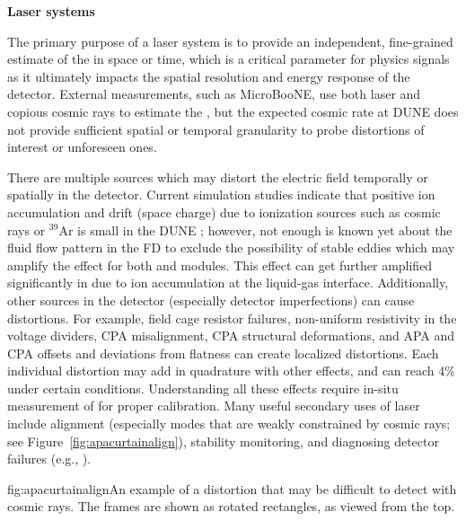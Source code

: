 \textbf{Laser systems} 

The primary purpose of a laser system is to provide an independent, fine-grained estimate of the \efield in space or time, which is a critical parameter for physics signals as it ultimately impacts the spatial resolution and energy response of the detector. External measurements, such as MicroBooNE, use both laser and copious cosmic rays to estimate the \efield, but the expected cosmic rate at DUNE does not provide sufficient spatial or temporal granularity to probe distortions of interest or unforeseen ones. 

There are multiple sources which may distort the electric field temporally or spatially in the detector. Current simulation studies indicate that positive ion accumulation and drift (space charge) due to ionization sources such as cosmic rays or ${}^{39}$Ar is small in the DUNE ; however, not enough is known yet about the fluid flow pattern in the FD to exclude the possibility of stable eddies which may amplify the effect for both \single and \dual modules. This effect can get further amplified significantly in  due to ion accumulation at the liquid-gas interface. 
Additionally, other sources in the detector (especially detector imperfections) can cause \efield distortions. For example, field cage resistor failures, non-uniform resistivity in the voltage dividers, CPA misalignment, CPA structural deformations, and APA and CPA offsets and  deviations from flatness can create localized \efield distortions. Each individual \efield distortion may add in quadrature with other effects, and can reach 4\% under certain conditions. Understanding all these effects require in-situ measurement of \efield for proper calibration. Many useful secondary uses of laser include alignment (especially modes that are weakly constrained by cosmic rays; see Figure~\ref{fig:apacurtainalign}), stability monitoring, and diagnosing detector failures (e.g., ).  

\begin{dunefigure}{fig:apacurtainalign}{An example of a distortion that may be difficult to detect with cosmic rays.  The  frames are shown as rotated rectangles, as viewed from the top.}
\end{dunefigure}

